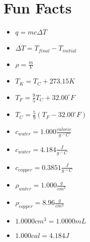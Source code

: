 \documentclass[11pt,addpoints]{exam}   	%
\begin{document}
\section*{Fun Facts}
\begin{multicols}{2}
\begin{itemize}
\item
$q = m c \Delta T$
\vspace{0.2in}

\item
$\Delta T = T_{final} - T_{initial}$
\vspace{0.2in}

\item
$\rho = \frac{m}{V} $
\vspace{0.2in}

\item
$T_K = T_C + 273.15 K$
\vspace{0.2in}

\item
$T_F = \frac{9}{5}T_C + 32.00^{\circ}F$
\vspace{0.2in}

\item
$T_C = \frac{5}{9}(T_F - 32.00^{\circ}F)$
\vspace{0.2in}

\item
$c_{water} = 1.000 \frac{calorie}{g \cdot ^{\circ}C}$
\vspace{0.2in}

\item
$c_{water} = 4.184 \frac{J}{g \cdot ^{\circ}C}$
\vspace{0.2in}

\item
$c_{copper} = 0.3851 \frac{J}{g \cdot ^{\circ}C}$
\vspace{0.2in}

\item
$\rho_{water} = 1.000 \frac{g}{cm^3}$
\vspace{0.2in}

\item
$\rho_{copper} = 8.96 \frac{g}{cm^3}$
\vspace{0.2in}

\item
$ 1.0000 cm^3 = 1.0000 mL $
\vspace{0.2in}

\item
$ 1.000 cal = 4.184 J $
\end{itemize}
\vspace{0.2in}

\end{multicols}
\end{document}
